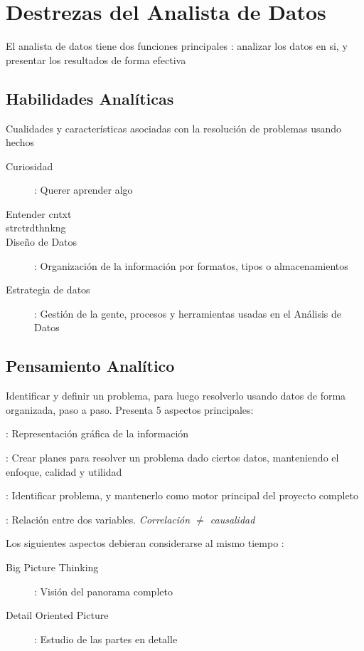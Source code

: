 
\section{Destrezas del Analista de Datos}
El analista de datos tiene dos funciones principales : analizar los datos en si, y presentar los resultados de forma efectiva

\subsection{Habilidades Analíticas}
Cualidades y características asociadas con la resolución de problemas usando hechos
\begin{description}
    \item[Curiosidad] : Querer aprender algo
    \item[Entender \gls{cntxt}]
    \item[\gls{strctrdthnkng}]
    \item[Diseño de Datos] : Organización de la información por formatos, tipos o almacenamientos
    \item[Estrategia de datos] : Gestión de la gente, procesos y herramientas usadas en el Análisis de Datos
\end{description}

\subsection{Pensamiento Analítico}
Identificar y definir un problema, para luego resolverlo usando datos de forma organizada, paso a paso. Presenta 5 aspectos principales:
\begin{description}
    \item[Visualización] : Representación gráfica de la información
    \item[Ser Estratégico] : Crear planes para resolver un problema dado ciertos datos, manteniendo el enfoque, calidad y utilidad
    \item[Pensamiento Orientado a Problemas] : Identificar problema, y mantenerlo como motor principal del proyecto completo
    \item[Correlación] : Relación entre dos variables. \textit{Correlación ${\neq}$ causalidad}
    \item{Los siguientes aspectos debieran considerarse al mismo tiempo :
    \begin{description}
        \item[Big Picture Thinking] : Visión del panorama completo
        \item[Detail Oriented Picture] : Estudio de las partes en detalle
    \end{description}}
\end{description}

